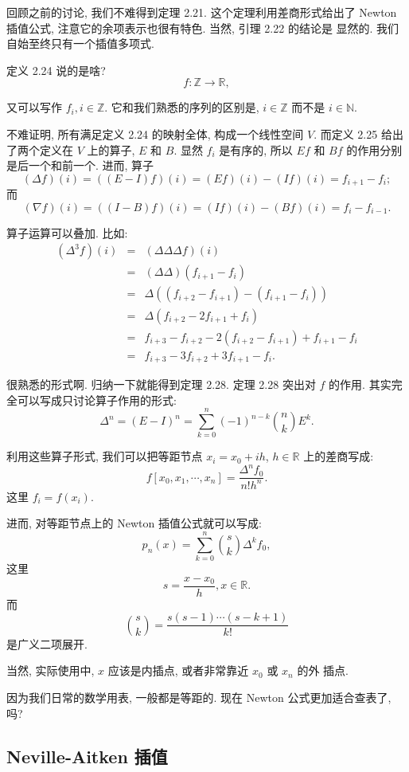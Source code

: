 \documentclass[a4paper]{ctexart}
\begin{document}
回顾之前的讨论, 我们不难得到定理 2.21. 这个定理利用差商形式给出了
Newton 插值公式, 注意它的余项表示也很有特色. 当然, 引理 2.22 的结论是
显然的. 我们自始至终只有一个插值多项式. 

定义 2.24 说的是啥?
$$
f : \mathbb{Z} \to \mathbb{R},
$$

又可以写作 $f_i, i \in \mathbb{Z}$. 它和我们熟悉的序列的区别是, $i \in
\mathbb{Z}$ 而不是 $i \in \mathbb{N}$.

不难证明, 所有满足定义 2.24 的映射全体, 构成一个线性空间 $V$. 而定义
2.25 给出了两个定义在 $V$ 上的算子, $E$ 和 $B$. 显然 $f_i$ 是有序的,
所以 $Ef$ 和 $Bf$ 的作用分别是后一个和前一个. 进而, 算子
$$
(\Delta f)(i) = ((E - I) f)(i) = (E f)(i) - (I f)(i) = f_{i + 1} - f_i;
$$
而
$$
(\nabla f)(i) = ((I - B) f)(i) = (I f)(i) - (B f)(i) = f_i - f_{i - 1}.
$$

算子运算可以叠加. 比如:
$$
\begin{array}{rcl}
  (\Delta^3 f)(i) &=& (\Delta \Delta \Delta f)(i) \\
  &=& (\Delta \Delta) (f_{i + 1} - f_i) \\
  &=& \Delta ((f_{i + 2} - f_{i + 1}) - (f_{i + 1} - f_i)) \\
  &=& \Delta (f_{i + 2} - 2 f_{i + 1} + f_i) \\
  &=& f_{i + 3} - f_{i + 2} - 2(f_{i + 2} - f_{i + 1}) + f_{i + 1} - f_i \\
  &=& f_{i + 3} - 3 f_{i + 2} + 3 f_{i + 1} - f_i.
\end{array}
$$

很熟悉的形式啊. 归纳一下就能得到定理 2.28. 定理 2.28 突出对 $f$ 的作用.
其实完全可以写成只讨论算子作用的形式:
$$
\Delta^n = (E - I)^n = \sum_{k = 0}^n (-1)^{n - k}{n \choose k}E^k.
$$

利用这些算子形式, 我们可以把等距节点 $x_i = x_0 + ih$, $h \in
\mathbb{R}$ 上的差商写成:
$$
f[x_0, x_1, \cdots, x_n] = \frac{\Delta^n f_0}{n! h^n}.
$$
这里 $f_i = f(x_i)$.

进而, 对等距节点上的 Newton 插值公式就可以写成:
$$
p_n(x) = \sum_{k = 0}^n {s \choose k} \Delta^k f_0,
$$
这里
$$
s = \frac{x - x_0}h, x \in \mathbb{R}.
$$
而
$$
{s \choose k} = \frac{s(s - 1)\cdots(s - k + 1)}{k!}
$$
是广义二项展开.

当然, 实际使用中, $x$ 应该是内插点, 或者非常靠近 $x_0$ 或 $x_n$ 的外
插点.

因为我们日常的数学用表, 一般都是等距的. 现在 Newton 公式更加适合查表了, 吗?

\subsection{Neville-Aitken 插值}
\end{document}
